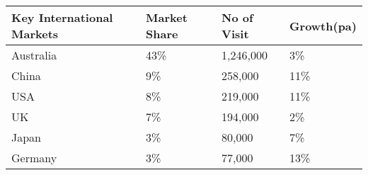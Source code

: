 \begin{tabular}{l{3pt}l{3pt}l{3pt}l{3pt}}
  \hline
Key International Markets & Market Share & No of Visit & Growth(pa) \\ 
  \hline
Australia & 43\% & 1,246,000 & 3\% \\ 
  China & 9\% &   258,000 & 11\% \\ 
  USA & 8\% &   219,000 & 11\% \\ 
  UK & 7\% &   194,000 & 2\% \\ 
  Japan & 3\% &    80,000 & 7\% \\ 
  Germany & 3\% &    77,000 & 13\% \\ 
   \hline
\end{tabular}
